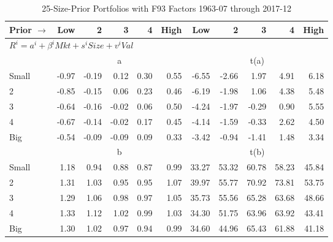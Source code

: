 
\begin{table}[!ht]
\footnotesize
\centering
\caption{25-Size-Prior Portfolios with F93 Factors 1963-07 through 2017-12}
\begin{tabular}{lrrrrrrrrrr}
  \toprule
    Prior $\rightarrow$ & Low & 2 & 3 & 4 & High & Low & 2 & 3 & 4 & High \\ 
  \midrule
  \multicolumn{11}{l}{$R^i=a^i+\beta^iMkt+s^iSize+v^iVal$} \\

  
    
      & \multicolumn{5}{c}{a} & \multicolumn{5}{c}{t(a)}
    
    \\
      \cmidrule(r){2-6} \cmidrule(r){7-11}

    Small   & -0.97  & -0.19  & 0.12  & 0.30  & 0.55  & -6.55  & -2.66  & 1.97  & 4.91  & 6.18  \\
         2  & -0.85  & -0.15  & 0.06  & 0.23  & 0.46  & -6.19  & -1.98  & 1.06  & 4.38  & 5.48  \\
         3  & -0.64  & -0.16  & -0.02  & 0.06  & 0.50  & -4.24  & -1.97  & -0.29  & 0.90  & 5.55  \\
         4  & -0.67  & -0.14  & -0.02  & 0.17  & 0.45  & -4.14  & -1.59  & -0.33  & 2.62  & 4.50  \\
    Big     & -0.54  & -0.09  & -0.09  & 0.09  & 0.33  & -3.42  & -0.94  & -1.41  & 1.48  & 3.34  \\

  
    
      & \multicolumn{5}{c}{b} & \multicolumn{5}{c}{t(b)}
    
    \\
      \cmidrule(r){2-6} \cmidrule(r){7-11}

    Small   & 1.18  & 0.94  & 0.88  & 0.87  & 0.99  & 33.27  & 53.32  & 60.78  & 58.23  & 45.84  \\
         2  & 1.31  & 1.03  & 0.95  & 0.95  & 1.07  & 39.97  & 55.77  & 70.92  & 73.81  & 53.75  \\
         3  & 1.29  & 1.06  & 0.98  & 0.97  & 1.05  & 35.73  & 55.56  & 65.28  & 63.68  & 48.66  \\
         4  & 1.33  & 1.12  & 1.02  & 0.99  & 1.03  & 34.30  & 51.75  & 63.96  & 63.92  & 43.41  \\
    Big     & 1.30  & 1.02  & 0.97  & 0.94  & 0.99  & 34.60  & 44.96  & 65.43  & 61.88  & 41.18  \\

  
    

\end{tabular}
\end{table}
